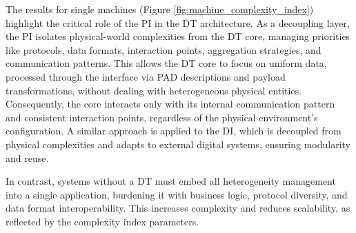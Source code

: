 The results for single machines (Figure \ref{fig:machine_complexity_index}) highlight the critical role of the PI in the \ac{DT} architecture.
As a decoupling layer, the PI isolates physical-world complexities from the DT core, managing priorities like protocols, data formats, interaction points, aggregation strategies, and communication patterns.
This allows the DT core to focus on uniform data, processed through the interface via PAD descriptions and payload transformations, without dealing with heterogeneous physical entities.
Consequently, the core interacts only with its internal communication pattern and consistent interaction points, regardless of the physical environment’s configuration.
A similar approach is applied to the DI, which is decoupled from physical complexities and adapts to external digital systems, ensuring modularity and reuse.

In contrast, systems without a \ac{DT} must embed all heterogeneity management into a single application, burdening it with business logic, protocol diversity, and data format interoperability.
This increases complexity and reduces scalability, as reflected by the complexity index parameters.



